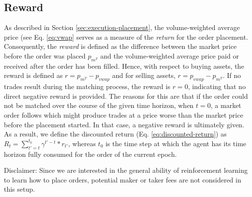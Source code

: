 \subsection{Reward}
\label{setup:reward}
As described in Section \ref{sec:execution-placement}, the volume-weighted average price (see Eq. \ref{eq:vwap} serves as a measure of the \textit{return} for the order placement.
Consequently, the \textit{reward} is defined as the difference between the market price before the order was placed $p_{m^T}$ and the volume-weighted average price paid or received after the order has been filled. 
Hence, with respect to buying assets, the reward is defined as $r=p_{m^T}-p_{vwap}$ and for selling assets, $r=p_{vwap}-p_{m^T}$.
If no trades result during the matching process, the reward is $r=0$, indicating that no direct negative reward is provided.
The reasons for this are that if the order could not be matched over the course of the given time horizon, when $t=0$, a market order follows which might produce trades at a price worse than the market price before the placement started.
In that case, a negative reward is ultimately given.
As a result, we define the discounted return (Eq. \ref{eq:discounted-return}) as $R_t=\sum_{t'=t}^{t_0}{\gamma^{t'-t}*r_{t'}}$, whereas $t_0$ is the time step at which the agent has its time horizon fully consumed for the order of the current epoch.

Disclaimer: Since we are interested in the general ability of reinforcement learning to learn how to place orders, potential maker or taker fees are not considered in this setup.

